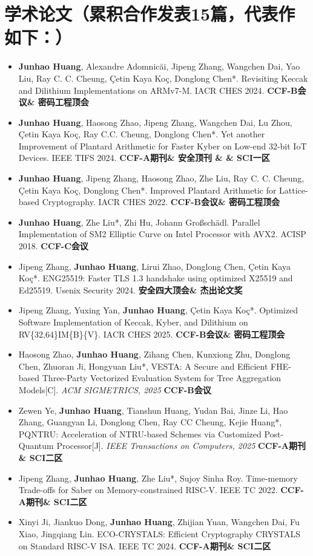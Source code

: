 \documentclass[UTF8,AutoFakeBold]{resume}
\begin{document}
\section{\hspace{0.25em}\makebox[0.75em][c]{\faFlask} \fangsong\textbf{学术论文（累积合作发表15篇，代表作如下：）}}
\begin{itemize}
    \item {\textbf{Junhao Huang}, Alexandre Adomnicăi, Jipeng Zhang, Wangchen Dai, Yao Liu, Ray C. C. Cheung, \c{C}etin Kaya Ko\c{c}, Donglong Chen*. Revisiting Keccak and Dilithium Implementations on ARMv7-M. IACR CHES 2024. \textbf{CCF-B会议\& 密码工程顶会}}
    \item {\textbf{Junhao Huang}, Haosong Zhao, Jipeng Zhang, Wangchen Dai, Lu Zhou, \c{C}etin Kaya Ko\c{c}, Ray C.C. Cheung, Donglong Chen*. Yet another Improvement of Plantard Arithmetic for Faster Kyber on Low-end 32-bit IoT Devices. IEEE TIFS 2024. \textbf{CCF-A期刊\& 安全顶刊 \& \& SCI一区}}
    \item {\textbf{Junhao Huang}, Jipeng Zhang, Haosong Zhao, Zhe Liu, Ray C. C. Cheung, \c{C}etin Kaya Ko\c{c}, Donglong Chen*. Improved Plantard Arithmetic for Lattice-based Cryptography. IACR CHES 2022. \textbf{CCF-B会议\& 密码工程顶会}}
    \item {\textbf{Junhao Huang}, Zhe Liu*, Zhi Hu, Johann Großschädl. Parallel Implementation of SM2 Elliptic Curve on Intel Processor with AVX2. ACISP 2018. \textbf{CCF-C会议}}
    \item {Jipeng Zhang, \textbf{Junhao Huang}, Lirui Zhao, Donglong Chen, Çetin Kaya Koç*. ENG25519: Faster TLS 1.3 handshake using optimized X25519 and Ed25519. Usenix Security 2024. \textbf{安全四大顶会\& 杰出论文奖}}
    \item  {Jipeng Zhang, Yuxing Yan, \textbf{Junhao Huang}, Çetin Kaya Koç*. Optimized Software Implementation of Keccak, Kyber, and Dilithium on RV\{32,64\}IM\{B\}\{V\}. IACR CHES 2025. \textbf{CCF-B会议\& 密码工程顶会}}
    \item {Haosong Zhao, \textbf{Junhao Huang}, Zihang Chen, Kunxiong Zhu, Donglong Chen, Zhuoran Ji, Hongyuan Liu*}, {VESTA: A Secure and Efficient FHE-based Three-Party {V}ectorized {E}valuation {S}ystem for {T}ree {A}ggregation Models[C]}. \textit{ACM SIGMETRICS, 2025} {\bf CCF-B会议}
    \item {
		{Zewen Ye, \textbf{Junhao Huang}, Tianshun Huang, Yudan Bai, Jinze Li, Hao Zhang, Guangyan Li, Donglong Chen, Ray CC Cheung, Kejie Huang*}, {PQNTRU: Acceleration of NTRU-based Schemes via Customized Post-Quantum Processor[J]}. \textit{IEEE Transactions on Computers, 2025} {\bf CCF-A期刊\& SCI二区}
	}
    \item {Jipeng Zhang, \textbf{Junhao Huang}, Zhe Liu*, Sujoy Sinha Roy. Time-memory Trade-offs for Saber on Memory-constrained RISC-V. IEEE TC 2022. \textbf{CCF-A期刊\& SCI二区}}
   
    \item {Xinyi Ji, Jiankuo Dong, \textbf{Junhao Huang}, Zhijian Yuan, Wangchen Dai, Fu Xiao, Jingqiang Lin. ECO-CRYSTALS: Efficient Cryptography CRYSTALS on Standard RISC-V ISA. IEEE TC 2024. \textbf{CCF-A期刊\& SCI二区}}
\end{itemize}
\end{document}
